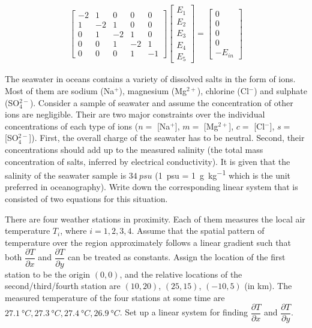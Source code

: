 \begin{solution}
\begin{align*}
\begin{bmatrix}
-2 & 1 & 0 & 0 & 0 \\
1 & -2 & 1 & 0 & 0 \\
0 & 1 & -2 & 1 & 0 \\
0 & 0 & 1 & -2 & 1 \\
0 & 0 & 0 & 1 & -1
\end{bmatrix}
\begin{bmatrix}
E_1 \\
E_2 \\
E_3 \\
E_4 \\
E_5
\end{bmatrix}
=
\begin{bmatrix}
0 \\
0 \\
0 \\
0 \\
-E_{in}
\end{bmatrix}
\end{align*}
\end{solution}

\begin{exmp}
The seawater in oceans contains a variety of dissolved salts in the form of ions. Most of them are sodium (Na$^+$), magnesium (Mg$^{2+}$), chlorine (Cl$^-$) and sulphate (SO$_4^{2-}$). Consider a sample of seawater and assume the concentration of other ions are negligible. Their are two major constraints over the individual concentrations of each type of ions ($n=$ [Na$^+$], $m=$ [Mg$^{2+}$], $c=$ [Cl$^-$], $s=$ [SO$_4^{2-}$]). First, the overall charge of the seawater has to be neutral. Second, their concentrations should add up to the measured salinity (the total mass concentration of salts, inferred by electrical conductivity). It is given that the salinity of the seawater sample is $\SI{34}{psu}$ (\SI{1}{psu} = \SI{1}{\g\per\kg} which is the unit preferred in oceanography). Write down the corresponding linear system that is consisted of two equations for this situation.
\end{exmp}

\begin{exmp}
There are four weather stations in proximity. Each of them measures the local air temperature $T_i$, where $i = 1,2,3,4$. Assume that the spatial pattern of temperature over the region approximately follows a linear gradient such that both $\dfrac{\partial T}{\partial x}$ and $\dfrac{\partial T}{\partial y}$ can be treated as constants. Assign the location of the first station to be the origin $(0,0)$, and the relative locations of the second/third/fourth station are $(10,20)$, $(25,15)$, $(-10,5)$ (in \si{\km}). The measured temperature of the four stations at some time are $\SI{27.1}{\degree C}, \SI{27.3}{\degree C}, \SI{27.4}{\degree C}, \SI{26.9}{\degree C}$. Set up a linear system for finding $\dfrac{\partial T}{\partial x}$ and $\dfrac{\partial T}{\partial y}$.
\end{exmp}

